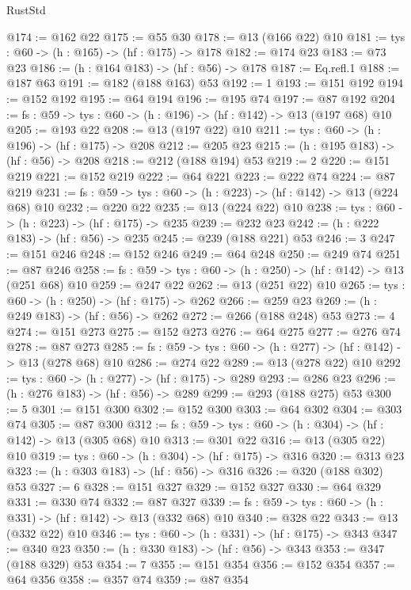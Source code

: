 \begin{lexlean}{RustStd}
\begin{coremodule}
@174 := @162 @22
@175 := @55 @30
@178 := @13 (@166 @22) @10
@181 := {tys : @60} -> (h : @165) -> (hf : @175) -> @178
@182 := @174 @23
@183 := @73 @23
@186 := (h : @164 @183) -> (hf : @56) -> @178
@187 := Eq.refl.{1}
@188 := @187 @63
@191 := @182 (@188 @163) @53
@192 := 1
@193 := @151 @192
@194 := @152 @192
@195 := @64 @194
@196 := @195 @74
@197 := @87 @192
@204 := {fs : @59} -> {tys : @60} -> (h : @196) -> (hf : @142) -> @13 (@197 @68) @10
@205 := @193 @22
@208 := @13 (@197 @22) @10
@211 := {tys : @60} -> (h : @196) -> (hf : @175) -> @208
@212 := @205 @23
@215 := (h : @195 @183) -> (hf : @56) -> @208
@218 := @212 (@188 @194) @53
@219 := 2
@220 := @151 @219
@221 := @152 @219
@222 := @64 @221
@223 := @222 @74
@224 := @87 @219
@231 := {fs : @59} -> {tys : @60} -> (h : @223) -> (hf : @142) -> @13 (@224 @68) @10
@232 := @220 @22
@235 := @13 (@224 @22) @10
@238 := {tys : @60} -> (h : @223) -> (hf : @175) -> @235
@239 := @232 @23
@242 := (h : @222 @183) -> (hf : @56) -> @235
@245 := @239 (@188 @221) @53
@246 := 3
@247 := @151 @246
@248 := @152 @246
@249 := @64 @248
@250 := @249 @74
@251 := @87 @246
@258 := {fs : @59} -> {tys : @60} -> (h : @250) -> (hf : @142) -> @13 (@251 @68) @10
@259 := @247 @22
@262 := @13 (@251 @22) @10
@265 := {tys : @60} -> (h : @250) -> (hf : @175) -> @262
@266 := @259 @23
@269 := (h : @249 @183) -> (hf : @56) -> @262
@272 := @266 (@188 @248) @53
@273 := 4
@274 := @151 @273
@275 := @152 @273
@276 := @64 @275
@277 := @276 @74
@278 := @87 @273
@285 := {fs : @59} -> {tys : @60} -> (h : @277) -> (hf : @142) -> @13 (@278 @68) @10
@286 := @274 @22
@289 := @13 (@278 @22) @10
@292 := {tys : @60} -> (h : @277) -> (hf : @175) -> @289
@293 := @286 @23
@296 := (h : @276 @183) -> (hf : @56) -> @289
@299 := @293 (@188 @275) @53
@300 := 5
@301 := @151 @300
@302 := @152 @300
@303 := @64 @302
@304 := @303 @74
@305 := @87 @300
@312 := {fs : @59} -> {tys : @60} -> (h : @304) -> (hf : @142) -> @13 (@305 @68) @10
@313 := @301 @22
@316 := @13 (@305 @22) @10
@319 := {tys : @60} -> (h : @304) -> (hf : @175) -> @316
@320 := @313 @23
@323 := (h : @303 @183) -> (hf : @56) -> @316
@326 := @320 (@188 @302) @53
@327 := 6
@328 := @151 @327
@329 := @152 @327
@330 := @64 @329
@331 := @330 @74
@332 := @87 @327
@339 := {fs : @59} -> {tys : @60} -> (h : @331) -> (hf : @142) -> @13 (@332 @68) @10
@340 := @328 @22
@343 := @13 (@332 @22) @10
@346 := {tys : @60} -> (h : @331) -> (hf : @175) -> @343
@347 := @340 @23
@350 := (h : @330 @183) -> (hf : @56) -> @343
@353 := @347 (@188 @329) @53
@354 := 7
@355 := @151 @354
@356 := @152 @354
@357 := @64 @356
@358 := @357 @74
@359 := @87 @354

\end{coremodule}
\end{lexlean}
